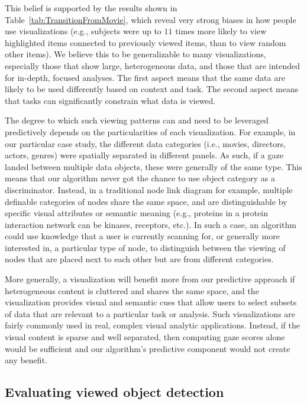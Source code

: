 This belief is supported by the results shown in Table~\ref{tab:TransitionFromMovie}, which reveal very strong biases in how people use visualizations (e.g., subjects were up to $11$ times more likely to view highlighted items connected to previously viewed items, than to view random other items). We believe this to be generalizable to many visualizations, especially those that show large, heterogeneous data, and those that are intended for in-depth, focused analyses. The first aspect means that the same data are likely to be used differently based on context and task. The second aspect means that  tasks can significantly constrain what data is viewed.    

The degree to which such viewing patterns can and need to be leveraged predictively depends on the particularities of each visualization. For example, in our particular case study, the different data categories (i.e., movies, directors, actors, genres) were spatially separated in different panels. As such, if a gaze landed between multiple data objects, these were generally of the same type. This means that our algorithm never got the chance to use object category as a discriminator. Instead, in a traditional node link diagram for example, multiple definable categories of nodes share the same space, and are distinguishable by specific visual attributes or semantic meaning (e.g., proteins in a protein interaction network can be kinases, receptors, etc.). In such a case, an algorithm could use knowledge that a user is currently scanning for, or generally more interested in, a particular type of node, to distinguish between the viewing of nodes that are placed next to each other but are from different categories.  

More generally, a visualization will benefit more from our predictive approach if heterogeneous content is cluttered and shares the same space, and the visualization provides visual and semantic cues that allow users to select subsets of  data that are relevant to a particular task or analysis. Such visualizations are fairly commonly used in real, complex visual analytic applications. Instead, if the visual content is sparse and well separated, then computing gaze scores alone would be sufficient and our algorithm's predictive component would not create any benefit.


\subsection{Evaluating viewed object detection} 
\label{sec:DiscussionEvaluatingViewedObjectDetection}

